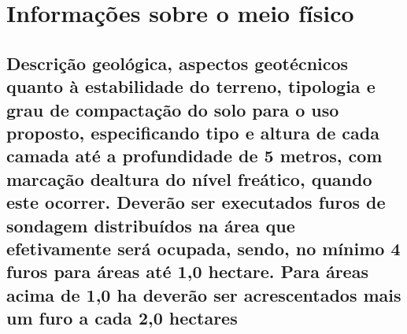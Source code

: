 \section{Informações sobre o meio físico}

\subsection{Descrição geológica, aspectos geotécnicos quanto à estabilidade do terreno, tipologia e grau de compactação do solo para o uso proposto, especificando tipo e altura de cada camada até a profundidade de 5 metros, com marcação dealtura do nível freático, quando este ocorrer. Deverão ser executados furos de sondagem distribuídos na área que efetivamente será ocupada, sendo, no mínimo 4 furos para áreas até 1,0 hectare. Para áreas acima de 1,0 ha deverão ser acrescentados mais um furo a cada 2,0 hectares}
